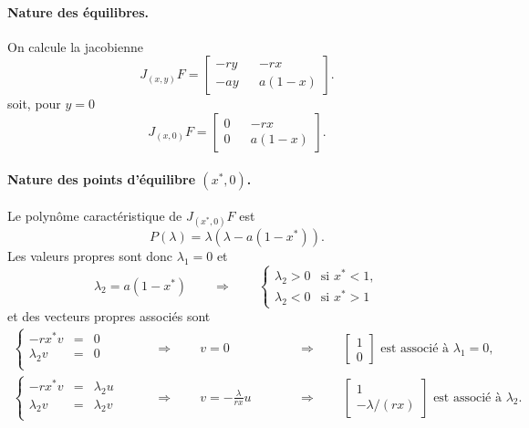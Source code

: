 \paragraph{Nature des équilibres.}
On calcule la jacobienne
$$
J_{(x, y)}F = 
  \left[\begin{array}{ccc} 
    - r y & & -r x \\
    - a y & & a (1 - x)
  \end{array}\right].
$$
soit, pour $y = 0$
$$
J_{(x, 0)}F = 
  \left[\begin{array}{ccc} 
    0 & & -r x \\
    0 & & a (1 - x)
  \end{array}\right].
$$

\paragraph{Nature des points d'équilibre $(x^*, 0)$.}
Le polynôme caractéristique de $J_{(x^*, 0)}F$ est
$$
P(\lambda) = \lambda (\lambda - a (1 - x^*)).
$$
Les valeurs propres sont donc $\lambda_1 = 0$ et 
$$
\lambda_2 = a (1 - x^*) 
\qquad \Rightarrow \qquad 
\left\{\begin{array}{ll} 
  \lambda_2 > 0 & \text{si } x^* < 1, \\
  \lambda_2 < 0 & \text{si } x^* > 1
\end{array} \right.
$$
et des vecteurs propres associés sont
\begin{align*}
  \left\{\begin{array}{rcl}
      -r x^* v & = & 0 \\
      \lambda_2 v & = & 0 \\
    \end{array}\right.
    \qquad & \Rightarrow \qquad 
    v = 0 &
    \qquad & \Rightarrow \qquad 
    \left[\begin{array}{c} 1 \\ 0 \end{array}\right] \text{ est associé à } \lambda_1 = 
    0, \\
  \left\{\begin{array}{rcl}
      -r x^* v & = & \lambda_2 u \\
      \lambda_2 v & = & \lambda_2 v \\
    \end{array}\right.
    \qquad & \Rightarrow \qquad 
    v = - \frac{\lambda}{rx} u &
    \qquad & \Rightarrow \qquad 
    \left[\begin{array}{c} 1 \\ -\lambda/(rx) \end{array}\right] \text{ est associé à } \lambda_2.
\end{align*}


